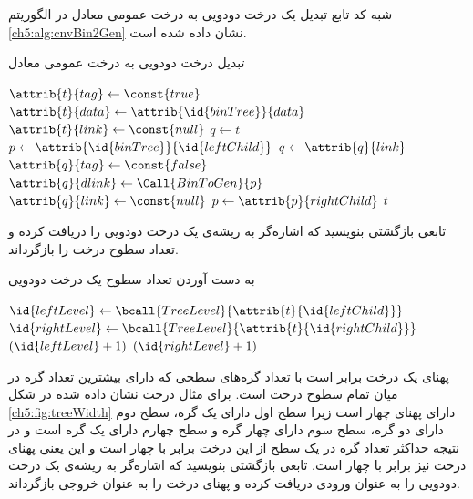 
شبه کد تابع تبدیل یک درخت دودویی به درخت عمومی معادل‌ در الگوریتم {\ref{ch5:alg:cnvBin2Gen}} نشان داده شده است. 
\begin{algorithm}
\caption{تبدیل درخت دودویی به درخت عمومی معادل}\label{ch5:alg:cnvBin2Gen}
\begin{latin}
\begin{algorithmic}[1]
				\State	\Return {}
		\EndIf
		\State	{}
		\State	$\attrib{t}{tag} \gets \const{true}$
		\State	$\attrib{t}{data} \gets \attrib{\id{binTree}}{data}$
		\State	$\attrib{t}{link} \gets \const{null}$
		\State	$q \gets t$
		\State	$p \gets \attrib{\id{binTree}}{\id{leftChild}}$
				\State	{}
				\State	$q \gets \attrib{q}{link}$
				\State	$\attrib{q}{tag} \gets \const{false}$
				\State	$\attrib{q}{dlink} \gets \Call{BinToGen}{p}$
				\State	$\attrib{q}{link} \gets \const{null}$
				\State	$p \gets \attrib{p}{rightChild}$
		\EndWhile
		\State	\Return $t$
\EndFunction
\end{algorithmic}
\end{latin}
\end{algorithm}

 تابعی بازگشتی بنویسید که اشاره‌گر به ریشه‌ی یک درخت دودویی را دریافت کرده و تعداد سطوح درخت را بازگرداند.


\begin{algorithm}
\caption{به دست آوردن تعداد سطوح یک درخت دودویی}\label{ch5:alg:treeLevel}
\begin{latin}
\begin{algorithmic}[1]
			\State	{}
		\EndIf
		\State	$\id{leftLevel} \gets \bcall{TreeLevel}{\attrib{t}{\id{leftChild}}}$
		\State	$\id{rightLevel} \gets \bcall{TreeLevel}{\attrib{t}{\id{rightChild}}}$			
			\State	\Return	$(\id{leftLevel} + 1)$
		\Else
			\State	\Return $(\id{rightLevel} + 1)$
		\EndIf
\EndFunction
\end{algorithmic}
\end{latin}
\end{algorithm}

 پهنای یک درخت برابر است با تعداد گره‌های سطحی که دارای بیشترین تعداد گره در میان تمام سطوح درخت است.  برای مثال درخت نشان داده شده در شکل {\eqref{ch5:fig:treeWidth}} دارای پهنای چهار است زیرا سطح اول دارای یک گره، سطح دوم دارای دو گره، سطح سوم دارای چهار گره و سطح چهارم دارای یک گره است و در نتیجه حداکثر تعداد گره در یک سطح از این درخت برابر با چهار است و این یعنی پهنای درخت نیز برابر با چهار است. تابعی بازگشتی بنویسید که اشاره‌گر به ریشه‌ی یک درخت دودویی را به عنوان ورودی دریافت کرده و پهنای درخت را به عنوان خروجی بازگرداند.

